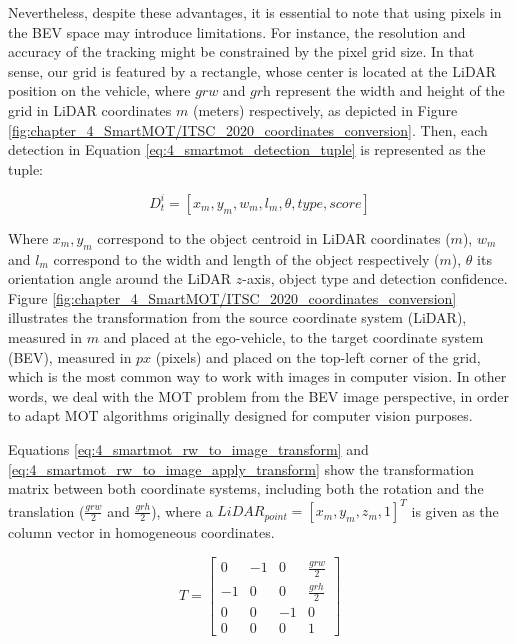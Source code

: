 Nevertheless, despite these advantages, it is essential to note that using pixels in the \ac{BEV} space may introduce limitations. For instance, the resolution and accuracy of the tracking might be constrained by the pixel grid size. In that sense, our grid is featured by a rectangle, whose center is located at the \ac{LiDAR} position on the vehicle, where $\textit{grw}$ and $\textit{grh}$ represent the width and height of the grid in \ac{LiDAR} coordinates $\textit{m}$ (meters) respectively, as depicted in Figure \ref{fig:chapter_4_SmartMOT/ITSC_2020_coordinates_conversion}. Then, each detection in Equation \ref{eq:4_smartmot_detection_tuple} is represented as the tuple:

\begin{equation}
	\label{eq:4_smartmot_detection_tuple}
	D_{t}^{i} = [x_{m},y_{m},w_{m},l_{m},\theta,type,score]
\end{equation}

Where $\textit{$x_{m},y_{m}$}$ correspond to the object centroid in \ac{LiDAR} coordinates ($\textit{m}$), $\textit{$w_{m}$}$ and $\textit{$l_{m}$}$ correspond to the width and length of the object respectively ($\textit{m}$), $\theta$ its orientation angle around the \ac{LiDAR} $z$-axis, object type and detection confidence. Figure \ref{fig:chapter_4_SmartMOT/ITSC_2020_coordinates_conversion} illustrates the transformation from the source coordinate system (\ac{LiDAR}), measured in $\textit{m}$ and placed at the ego-vehicle, to the target coordinate system (\ac{BEV}), measured in $\textit{px}$ (pixels) and placed on the top-left corner of the grid, which is the most common way to work with images in computer vision. In other words, we deal with the \ac{MOT} problem from the \ac{BEV} image perspective, in order to adapt \ac{MOT} algorithms originally designed for computer vision purposes. 

Equations \ref{eq:4_smartmot_rw_to_image_transform} and \ref{eq:4_smartmot_rw_to_image_apply_transform} show the transformation matrix between both coordinate systems, including both the rotation and the translation (\textit{$\frac{grw}{2}$} and \textit{$\frac{grh}{2}$}), where a $LiDAR_{point}=[x_{m},y_{m},z_{m},1]^{T}$ is given as the column vector in homogeneous coordinates.

\begin{equation}
	\label{eq:4_smartmot_rw_to_image_transform}
	T = \left[ \begin{array}{cccc}
		0  &  -1 &  0  &  \frac{grw}{2} \\
		-1 &  0  &  0  &  \frac{grh}{2} \\
		0  &  0  &  -1 &  0            \\
		0  &  0  &  0  &  1 \end{array} \right] 
\end{equation}

